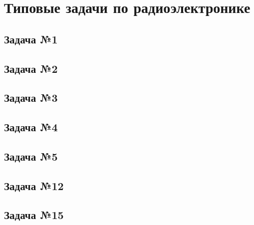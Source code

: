 \documentclass[a4paper,14pt]{extarticle}
\theoremstyle{definition}
\begin{document}
\section{Типовые задачи по радиоэлектронике}

\subsection{Задача №1}

\newpage

\subsection{Задача №2}

\newpage

\subsection{Задача №3}

\newpage

\subsection{Задача №4}

\newpage

\subsection{Задача №5}

\newpage

\subsection{Задача №12}


\subsection{Задача №15}

\end{document}
